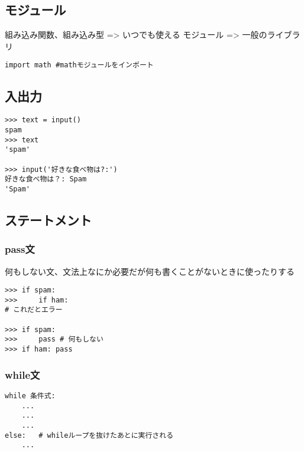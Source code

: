 \documentclass[a4j,here,10pt,oneside,openany]{jsbook}
\begin{document}
\subsection{モジュール}\label{ux30e2ux30b8ux30e5ux30fcux30eb}

組み込み関数、組み込み型 =\textgreater{} いつでも使える モジュール
=\textgreater{} 一般のライブラリ
\begin{framed}
\begin{verbatim}
import math #mathモジュールをインポート
\end{verbatim}
\end{framed}
\subsection{入出力}\label{ux5165ux51faux529b}
\begin{framed}
\begin{verbatim}
>>> text = input()
spam
>>> text
'spam'

>>> input('好きな食べ物は?:')
好きな食べ物は？: Spam
'Spam'
\end{verbatim}
\end{framed}
\subsection{ステートメント}\label{ux30b9ux30c6ux30fcux30c8ux30e1ux30f3ux30c8}

\subsubsection{pass文}\label{passux6587}

何もしない文、文法上なにか必要だが何も書くことがないときに使ったりする
\begin{framed}
\begin{verbatim}
>>> if spam:
>>>     if ham:
# これだとエラー

>>> if spam:
>>>     pass # 何もしない
>>> if ham: pass
\end{verbatim}
\end{framed}
\subsubsection{while文}\label{whileux6587}
\begin{framed}
\begin{verbatim}
while 条件式:
    ...
    ...
    ...
else:   # whileループを抜けたあとに実行される
    ...
\end{verbatim}
\end{framed}
\end{document}
